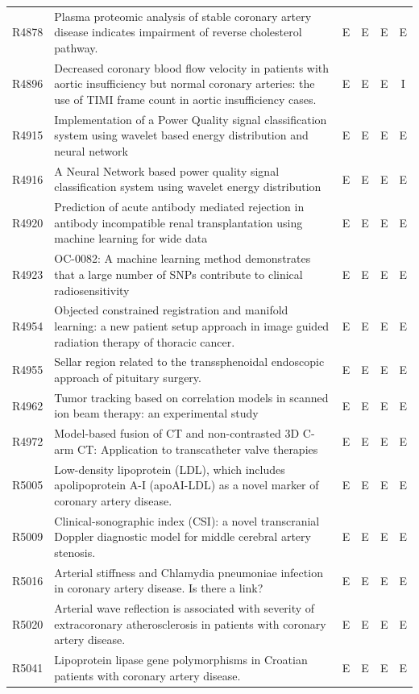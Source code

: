 \begin{longtable}{@{}l p{8.6cm} c c c c@{}}
R4878 & Plasma proteomic analysis of stable coronary artery disease indicates impairment of reverse cholesterol pathway. & E & E & E & E \\
R4896 & Decreased coronary blood flow velocity in patients with aortic insufficiency but normal coronary arteries: the use of TIMI frame count in aortic insufficiency cases. & E & E & E & I \\
R4915 & Implementation of a Power Quality signal classification system using wavelet based energy distribution and neural network & E & E & E & E \\
R4916 & A Neural Network based power quality signal classification system using wavelet energy distribution & E & E & E & E \\
R4920 & Prediction of acute antibody mediated rejection in antibody incompatible renal transplantation using machine learning for wide data & E & E & E & E \\
R4923 & OC-0082: A machine learning method demonstrates that a large number of SNPs contribute to clinical radiosensitivity & E & E & E & E \\
R4954 & Objected constrained registration and manifold learning: a new patient setup approach in image guided radiation therapy of thoracic cancer. & E & E & E & E \\
R4955 & Sellar region related to the transsphenoidal endoscopic approach of pituitary surgery. & E & E & E & E \\
R4962 & Tumor tracking based on correlation models in scanned ion beam therapy: an experimental study & E & E & E & E \\
R4972 & Model-based fusion of CT and non-contrasted 3D C-arm CT: Application to transcatheter valve therapies & E & E & E & E \\
R5005 & Low-density lipoprotein (LDL), which includes apolipoprotein A-I (apoAI-LDL) as a novel marker of coronary artery disease. & E & E & E & E \\
R5009 & Clinical-sonographic index (CSI): a novel transcranial Doppler diagnostic model for middle cerebral artery stenosis. & E & E & E & E \\
R5016 & Arterial stiffness and Chlamydia pneumoniae infection in coronary artery disease. Is there a link? & E & E & E & E \\
R5020 & Arterial wave reflection is associated with severity of extracoronary atherosclerosis in patients with coronary artery disease. & E & E & E & E \\
R5041 & Lipoprotein lipase gene polymorphisms in Croatian patients with coronary artery disease. & E & E & E & E \\
\end{longtable}
